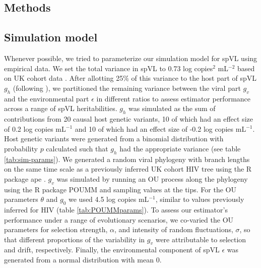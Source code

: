 \documentclass[]{article}
\begin{document}
\begin{doublespace}
\section{Methods}

\subsection{Simulation model}

Whenever possible, we tried to parameterize our simulation model for spVL using empirical data. We set the total variance in spVL to 0.73 log copies$^2$ mL$^{-2}$ based on UK cohort data \parencite{Mitov2018}. After allotting 25\% of this variance to the host part of spVL $g_h$ (following \citealt{McLaren2015}), we partitioned the remaining variance between the viral part $g_v$ and the environmental part $\epsilon$ in different ratios to assess estimator performance across a range of spVL heritabilities. $g_h$ was simulated as the sum of contributions from 20 causal host genetic variants, 10 of which had an effect size of 0.2 log copies mL$^{-1}$ and 10 of which had an effect size of -0.2 log copies mL$^{-1}$. Host genetic variants were generated from a binomial distribution with probability $p$ calculated such that $g_h$ had the appropriate variance (see table \ref{tab:sim-params}). We generated a random viral phylogeny with branch lengths on the same time scale as a previously inferred UK cohort HIV tree \parencite{Hodcroft2014} using the R package ape \parencite{Paradis2018}. $g_v$ was simulated by running an OU process along the phylogeny using the R package POUMM \parencite{Mitov2017a-POUMM} and sampling values at the tips. For the OU parameters $\theta$ and $g_{0}$ we used 4.5 log copies mL$^{-1}$, similar to values previously inferred for HIV (table \ref{tab:POUMMparams}). To assess our estimator's performance under a range of evolutionary scenarios, we co-varied the OU parameters for selection strength, $\alpha$, and intensity of random fluctuations, $\sigma$, so that different proportions of the variability in $g_v$ were attributable to selection and drift, respectively. Finally, the environmental component of spVL $\epsilon$ was generated from a normal distribution with mean 0.


\end{doublespace}
\end{document}

